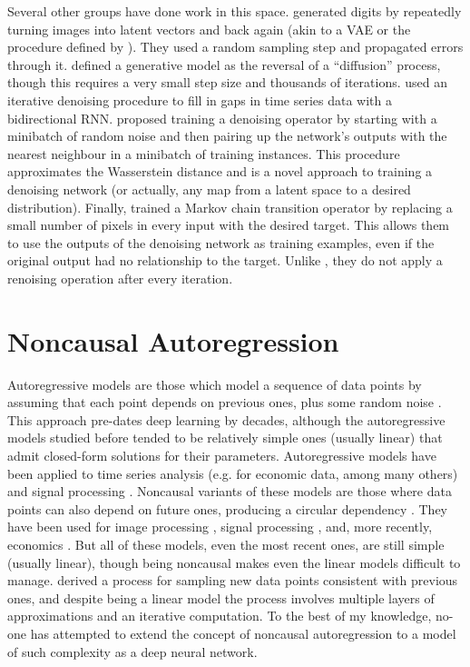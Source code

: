 \documentclass[11pt, a4paper, openany]{book}
\newcommand{\nquote}[1]{``{#1}''}
\begin{document}
Several other groups have done work in this space. \citet{markovinference} generated digits by repeatedly turning images into latent vectors and back again (akin to a VAE or the procedure defined by \citet{gsn}). They used a random sampling step and propagated errors through it. \citet{denoisingthermo} defined a generative model as the reversal of a \nquote{diffusion} process, though this requires a very small step size and thousands of iterations. \citet{brnndenoise} used an iterative denoising procedure to fill in gaps in time series data with a bidirectional RNN. \citet{iterativeclosest} proposed training a denoising operator by starting with a minibatch of random noise and then pairing up the network's outputs with the nearest neighbour in a minibatch of training instances. This procedure approximates the Wasserstein distance and is a novel approach to training a denoising network (or actually, any map from a latent space to a desired distribution). Finally, \citet{infusion} trained a Markov chain transition operator by replacing a small number of pixels in every input with the desired target. This allows them to use the outputs of the denoising network as training examples, even if the original output had no relationship to the target. Unlike \citet{denoisinggenerative}, they do not apply a renoising operation after every iteration.

\section{Noncausal Autoregression}

Autoregressive models are those which model a sequence of data points by assuming that each point depends on previous ones, plus some random noise \citep{autoregressive1}. This approach pre-dates deep learning by decades, although the autoregressive models studied before tended to be relatively simple ones (usually linear) that admit closed-form solutions for their parameters. Autoregressive models have been applied to time series analysis (e.g. for economic data, among many others) and signal processing \citep{timeseries}. Noncausal variants of these models are those where data points can also depend on future ones, producing a circular dependency \citep{noncausallikelihood}. They have been used for image processing \citep{noncausalimage1,noncausalimage2}, signal processing \citep{noncausalsignal}, and, more recently, economics \citep{noncausaleco1,noncausaleco2}. But all of these models, even the most recent ones, are still simple (usually linear), though being noncausal makes even the linear models difficult to manage. \citet{noncausaleco2} derived a process for sampling new data points consistent with previous ones, and despite being a linear model the process involves multiple layers of approximations and an iterative computation. To the best of my knowledge, no-one has attempted to extend the concept of noncausal autoregression to a model of such complexity as a deep neural network.
\end{document}
